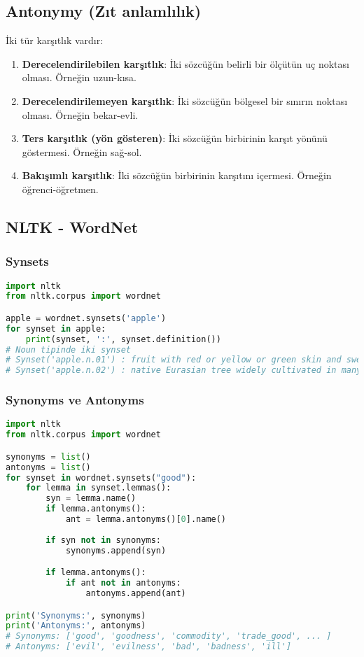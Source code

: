 \subsection{Antonymy (Zıt anlamlılık)}
İki tür karşıtlık vardır:

\begin{enumerate}
	\item \textbf{Derecelendirilebilen karşıtlık}: İki sözcüğün belirli bir ölçütün uç noktası olması. Örneğin uzun-kısa.
	\item \textbf{Derecelendirilemeyen karşıtlık}: İki sözcüğün bölgesel bir sınırın noktası olması. Örneğin bekar-evli.
	\item \textbf{Ters karşıtlık (yön gösteren)}: İki sözcüğün birbirinin karşıt yönünü göstermesi. Örneğin sağ-sol.
	\item \textbf{Bakışımlı karşıtlık}: İki sözcüğün birbirinin karşıtını içermesi. Örneğin öğrenci-öğretmen.
\end{enumerate}

\subsection{NLTK - WordNet}
\subsubsection{Synsets}
\begin{lstlisting}[language=Python]
import nltk
from nltk.corpus import wordnet

apple = wordnet.synsets('apple')
for synset in apple:
    print(synset, ':', synset.definition())
# Noun tipinde iki synset
# Synset('apple.n.01') : fruit with red or yellow or green skin and sweet to tart crisp whitish flesh
# Synset('apple.n.02') : native Eurasian tree widely cultivated in many varieties for its firm rounded edible fruits
\end{lstlisting}

\subsubsection{Synonyms ve Antonyms}
\begin{lstlisting}[language=Python]
import nltk
from nltk.corpus import wordnet

synonyms = list()
antonyms = list()
for synset in wordnet.synsets("good"):
    for lemma in synset.lemmas():
        syn = lemma.name()
        if lemma.antonyms():
            ant = lemma.antonyms()[0].name()
        
        if syn not in synonyms:
            synonyms.append(syn)

        if lemma.antonyms():
            if ant not in antonyms:
                antonyms.append(ant)

print('Synonyms:', synonyms)
print('Antonyms:', antonyms)
# Synonyms: ['good', 'goodness', 'commodity', 'trade_good', ... ]
# Antonyms: ['evil', 'evilness', 'bad', 'badness', 'ill']
\end{lstlisting}

